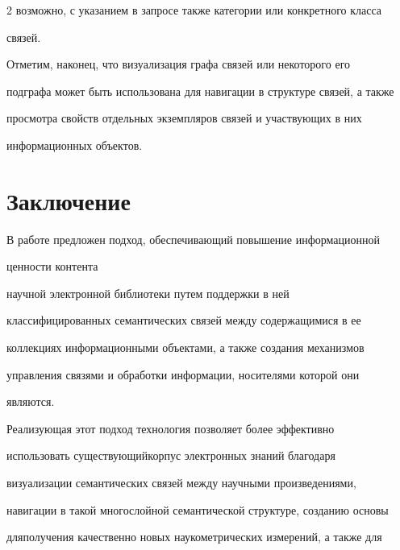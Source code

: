 \begin{multicols}{2}
возможно, с указанием в запросе также категории или конкретного класса 


связей.


  


  Отметим, наконец, что визуализация графа связей или некоторого его 


подграфа может быть использована для навигации в структуре связей, а также 


просмотра свойств отдельных экземпляров связей и участвующих в них 


информационных объектов.










\section{Заключение}





  В работе предложен подход, обеспечивающий повышение информационной 


ценности контента


 научной электронной библиотеки путем поддержки в ней 


классифицированных семантических связей между содержащимися в ее 


коллекциях информационными объектами, а также создания механизмов 


управления связями и обработки информации, носителями которой они 


являются.


  


  Реализующая этот подход технология позволяет более эффективно 


использовать существующий\linebreak корпус электронных знаний благодаря 


визуализации семантических связей между научными произведениями, 


навигации в такой многослойной семантической структуре, созданию основы 


для\linebreak получения качественно новых наукометрических измерений, а также для 



\end{multicols}
